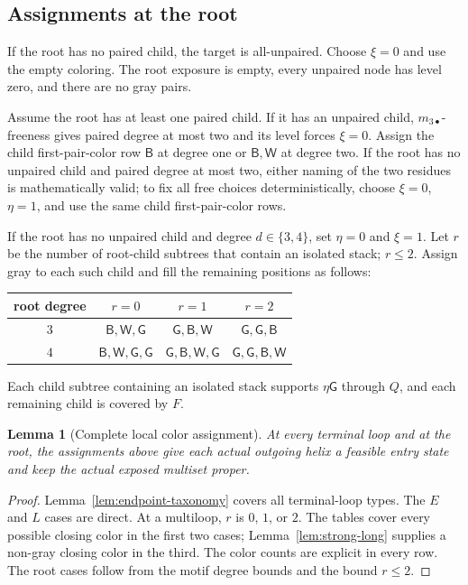 \documentclass[11pt]{article}
\newtheorem{lemma}[theorem]{Lemma}
\newcommand{\Bcol}{\mathsf{B}}
\newcommand{\Wcol}{\mathsf{W}}
\newcommand{\Gray}{\mathsf{G}}
\begin{document}
\subsection{Assignments at the root}

If the root has no paired child, the target is all-unpaired.  Choose $\xi=0$ and use the empty coloring.  The root exposure is empty, every unpaired node has level zero, and there are no gray pairs.

Assume the root has at least one paired child.  If it has an unpaired child, $m_{3\bullet}$-freeness gives paired degree at most two and its level forces $\xi=0$.  Assign the child first-pair-color row $\Bcol$ at degree one or $\Bcol,\Wcol$ at degree two.  If the root has no unpaired child and paired degree at most two, either naming of the two residues is mathematically valid; to fix all free choices deterministically, choose $\xi=0$, $\eta=1$, and use the same child first-pair-color rows.

If the root has no unpaired child and degree $d\in\{3,4\}$, set $\eta=0$ and $\xi=1$.  Let $r$ be the number of root-child subtrees that contain an isolated stack; $r\le2$.  Assign gray to each such child and fill the remaining positions as follows:
\begin{center}
\begin{tabular}{cccc}
\toprule
root degree & $r=0$ & $r=1$ & $r=2$ \\
\midrule
$3$ & $\Bcol,\Wcol,\Gray$ & $\Gray,\Bcol,\Wcol$ & $\Gray,\Gray,\Bcol$ \\
$4$ & $\Bcol,\Wcol,\Gray,\Gray$ & $\Gray,\Bcol,\Wcol,\Gray$ & $\Gray,\Gray,\Bcol,\Wcol$ \\
\bottomrule
\end{tabular}
\end{center}
Each child subtree containing an isolated stack supports $\eta\Gray$ through $Q$, and each remaining child is covered by $F$.

\begin{lemma}[Complete local color assignment]
\label{lem:complete-alloc}
At every terminal loop and at the root, the assignments above give each actual outgoing helix a feasible entry state and keep the actual exposed multiset proper.
\end{lemma}
\begin{proof}
Lemma~\ref{lem:endpoint-taxonomy} covers all terminal-loop types.  The $E$ and $L$ cases are direct.  At a multiloop, $r$ is $0$, $1$, or $2$.  The tables cover every possible closing color in the first two cases; Lemma~\ref{lem:strong-long} supplies a non-gray closing color in the third.  The color counts are explicit in every row.  The root cases follow from the motif degree bounds and the bound $r\le2$.
\end{proof}
\end{document}

